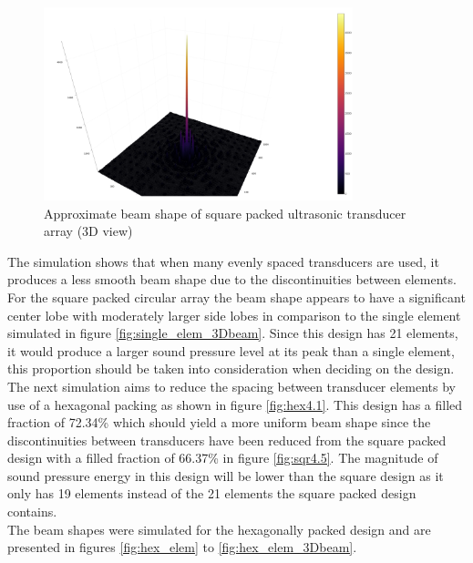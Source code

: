 \begin{figure}[ht!]
    \centering
    \includegraphics[width=0.8\textwidth]{Figures/arraySim/sqr/circ_sqr_beam3d.png}
    \caption{Approximate beam shape of square packed ultrasonic transducer array (3D view)}
    \label{fig:sqr_elem_3Dbeam}
\end{figure}

The simulation shows that when many evenly spaced transducers are used, it produces a less smooth beam shape due to the discontinuities between elements. For the square packed circular array the beam shape appears to have a significant center lobe with moderately larger side lobes in comparison to the single element simulated in figure \ref{fig:single_elem_3Dbeam}. Since this design has 21 elements, it would produce a larger sound pressure level at its peak than a single element, this proportion should be taken into consideration when deciding on the design.\\

The next simulation aims to reduce the spacing between transducer elements by use of a hexagonal packing as shown in figure \ref{fig:hex4.1}. This design has a filled fraction of 72.34\% which should yield a more uniform beam shape since the discontinuities between transducers have been reduced from the square packed design with a filled fraction of 66.37\% in figure \ref{fig:sqr4.5}. The magnitude of sound pressure energy in this design will be lower than the square design as it only has 19 elements instead of the 21 elements the square packed design contains.\\
The beam shapes were simulated for the hexagonally packed design and are presented in figures \ref{fig:hex_elem} to \ref{fig:hex_elem_3Dbeam}.


